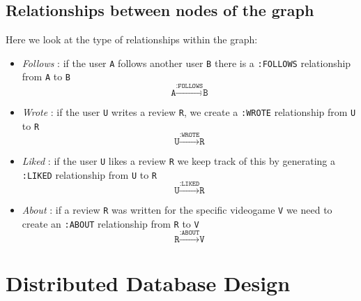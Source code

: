 \subsection{Relationships between nodes of the graph}
Here we look at the type of relationships within the graph:
\begin{itemize}
    \item \emph{Follows} : if the user \texttt{A} follows another user \texttt{B} there is a \texttt{:FOLLOWS} relationship from \texttt{A} to \texttt{B}
\begin{equation*}
\texttt{A} \xrightarrow{\texttt{:FOLLOWS}} \texttt{B}
\end{equation*}
    \item \emph{Wrote} : if the user \texttt{U} writes a review \texttt{R}, we create a \texttt{:WROTE} relationship from \texttt{U} to \texttt{R}
\begin{equation*}
\texttt{U} \xrightarrow{\texttt{:WROTE}} \texttt{R}
\end{equation*}
    \item \emph{Liked} : if the user \texttt{U} likes a review \texttt{R} we keep track of this by generating a \texttt{:LIKED} relationship from \texttt{U} to \texttt{R}
\begin{equation*}
\texttt{U} \xrightarrow{\texttt{:LIKED}} \texttt{R}
\end{equation*}
    \item \emph{About} : if a review \texttt{R} was written for the specific videogame \texttt{V} we need to create an \texttt{:ABOUT} relationship from \texttt{R} to \texttt{V} 
\begin{equation*}
\texttt{R} \xrightarrow{\texttt{:ABOUT}} \texttt{V}
\end{equation*}
\end{itemize}
\section{Distributed Database Design}
